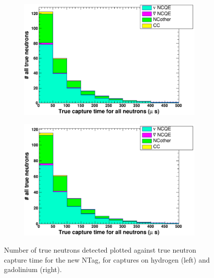 \begin{figure}
    \centering
     \begin{subfigure}[b]{0.49\linewidth}
      \includegraphics[width=\linewidth]{Figures/TruCapTimeReductionNewH.PNG}
     \end{subfigure}
     \begin{subfigure}[b]{0.49\linewidth}
       \includegraphics[width=\linewidth]{Figures/TruCapTimeReductionNewGd.PNG}
      \end{subfigure} 
      \caption{Number of true neutrons detected plotted against true neutron capture time for the new NTag, for captures on hydrogen (left) and gadolinium (right).}
      \label{fig:TruCapTimeReductionNewHGd} 
\end{figure}

